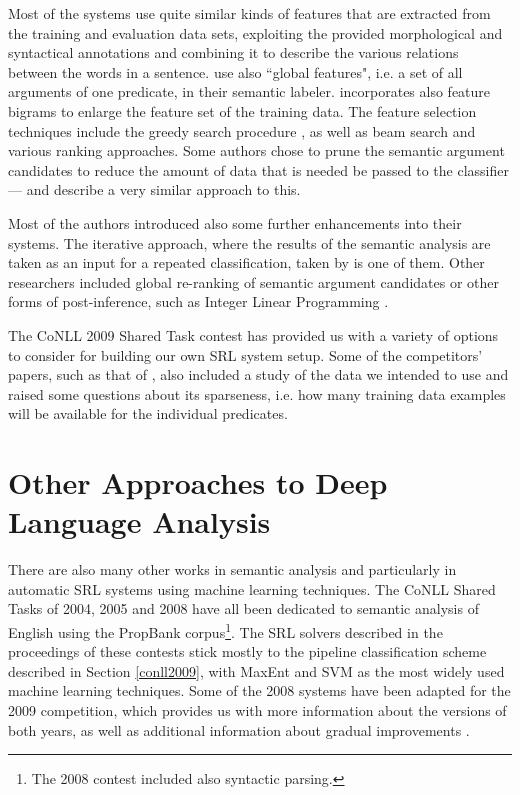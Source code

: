 \documentclass[12pt,notitlepage]{report}
\begin{document}
Most of the systems use quite similar kinds of features that are extracted from the training and evaluation data sets, exploiting the provided morphological and syntactical annotations and combining it to describe the various relations between the words in a sentence. \citet{asahara09} use also ``global features", i.e. a set of all arguments of one predicate, in their semantic labeler. \citet{nugues09} incorporates also feature bigrams to enlarge the feature set of the training data. The feature selection techniques include the greedy search procedure \citep[among others]{nugues09,zeman09}, as well as beam search \citep[][and others]{merlo09,nugues09} and various ranking approaches. Some authors chose to prune the semantic argument candidates to reduce the amount of data that is needed be passed to the classifier --- \citet{zhao09} and \citet{asahara09} describe a very similar approach to this.

Most of the authors introduced also some further enhancements into their systems. The iterative approach, where the results of the semantic analysis are taken as an input for a repeated classification, taken by \citet{chen09} is one of them. Other researchers included global re-ranking of semantic argument candidates \citep{nugues09} or other forms of post-inference, such as Integer Linear Programming \citep{che09}.

The CoNLL 2009 Shared Task contest has provided us with a variety of options to consider for building our own SRL system setup. Some of the competitors' papers, such as that of \citet{zeman09}, also included a study of the data we intended to use and raised some questions about its sparseness, i.e. how many training data examples will be available for the individual predicates.

\section{Other Approaches to Deep Language Analysis}

There are also many other works in semantic analysis and particularly in automatic SRL systems using machine learning techniques. The CoNLL Shared Tasks of 2004, 2005 \citep{carreras04,carreras05} and 2008 \citep{surdeanu08} have all been dedicated to semantic analysis of English using the PropBank corpus\footnote{The 2008 contest included also syntactic parsing.}. The SRL solvers described in the proceedings of these contests stick mostly to the pipeline classification scheme described in Section \ref{conll2009}, with MaxEnt and SVM as the most widely used machine learning techniques. Some of the 2008 systems have been adapted for the 2009 competition, which provides us with more information about the versions of both years, as well as additional information about gradual improvements \citep{che08,chen08}.
\end{document}
